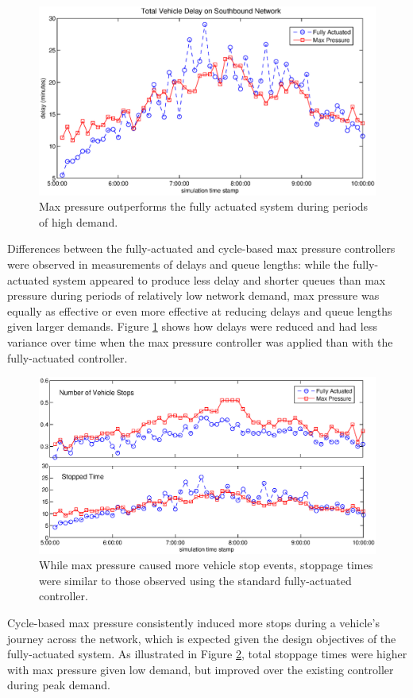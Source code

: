 \begin{figure}[h!]
\vspace{-.5em}
\centering
\includegraphics[width=\columnwidth]{./VehicleDelayPlot.eps}
\vspace{-2em}
\caption{Max pressure outperforms the fully actuated system during periods of high demand.\label{fig_delay}}
\vspace{-1em}
\end{figure}

Differences between the fully-actuated and cycle-based max pressure controllers were observed in measurements of delays and queue lengths: while the fully-actuated system appeared to produce less delay and shorter queues than max pressure during periods of relatively low network demand, max pressure was equally as effective or even more effective at reducing delays and queue lengths given larger demands. Figure \ref{fig_delay} shows how delays were reduced and had less variance over time when the max pressure controller was applied than with the fully-actuated controller. 
\begin{figure}[h!]
\centering
\includegraphics[width=\columnwidth]{./VehicleStopsPlot.eps}
\vspace{-2.5em}
\caption{While max pressure caused more vehicle stop events, stoppage times were similar to those observed using the standard fully-actuated controller.\label{fig_stops}}
\end{figure}

Cycle-based max pressure consistently induced more stops during a vehicle's journey across the network, which is expected given the design objectives of the fully-actuated system. As illustrated in Figure \ref{fig_stops}, total stoppage times were higher with max pressure given low demand, but improved over the existing controller during peak demand. 

